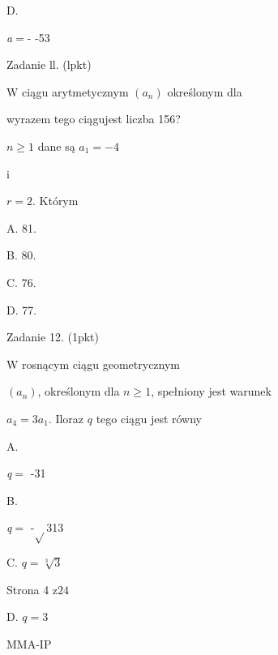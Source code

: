 \documentclass[a4paper,12pt]{article}
\begin{document}
D.

{\it a}$=$- -53

Zadanie ll. (lpkt)

$\mathrm{W}$ ciągu arytmetycznym $(a_{n})$ określonym dla

wyrazem tego ciągujest liczba 156?

$n\geq 1$ dane są $a_{1}=-4$

i

$r=2$. Którym

A. 81.

B. 80.

C. 76.

D. 77.

Zadanie 12. (1pkt)

W rosnącym ciągu geometrycznym

$(a_{n})$, określonym dla $n\geq 1$, spełniony jest warunek

$a_{4}=3a_{1}$. Iloraz $q$ tego ciągu jest równy

A.

{\it q}$=$ -31

B.

{\it q}$=$ -$\sqrt{}$313

C. $q=\sqrt[3]{3}$

Strona 4 $\mathrm{z}24$

D. $q=3$

MMA-IP
\end{document}

